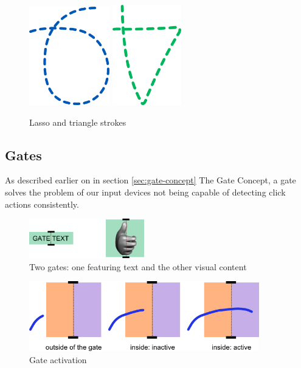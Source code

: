 \begin{figure}[!ht]
		\centering
		\includegraphics[width=3.5cm]{gfx/lasso.png}
		\qquad\qquad\qquad
		\includegraphics[width=3cm]{gfx/triangle.png}
		\caption{Lasso and triangle strokes}
		\label{fig:lasso-tri}
\end{figure}


\subsection{Gates}

As described earlier on in section \ref{sec:gate-concept} The Gate Concept,
a gate solves the problem of our input devices not being capable of detecting
click actions consistently.

\begin{figure}[!ht]
		\centering
		\includegraphics[width=5cm]{gfx/gate1e.png}
		\vspace{-0.5cm}
		\caption{Two gates: one featuring text and the other visual content}
		\label{fig:gate1}
\end{figure}

\begin{figure}[!ht]
		\vspace{-0.7cm}
		\centering
		\includegraphics[width=10cm]{gfx/gate2e.png}
		\vspace{-0.5cm}
		\caption{Gate activation}
		\label{fig:gate2}
\end{figure}


